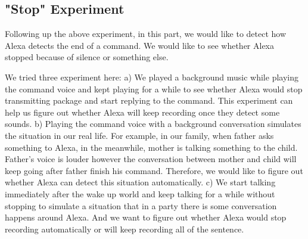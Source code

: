 \subsection{"Stop" Experiment}

Following up the above experiment, in this part, we would like to detect how Alexa detects the end of a command. We would like to see whether Alexa stopped because of silence or something else.

We tried three experiment here: a) We played a background music while playing the command voice and kept playing for a while to see whether Alexa would stop transmitting package and start replying to the command. This experiment can help us figure out whether Alexa will keep recording once they detect some sounds. b) Playing the command voice with a background conversation simulates the situation in our real life. For example, in our family, when father asks something to Alexa, in the meanwhile, mother is talking something to the child. Father's voice is louder however the conversation between mother and child will keep going after father finish his command. Therefore, we would like to figure out whether Alexa can detect this situation automatically. c) We start talking immediately after the wake up world and keep talking for a while without stopping to simulate a situation that in a party there is some conversation happens around Alexa. And we want to figure out whether Alexa would stop recording automatically or will keep recording all of the sentence.



